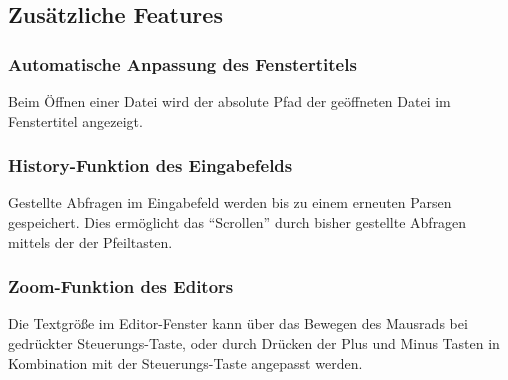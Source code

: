 \documentclass[parskip=full,11pt,twoside]{scrartcl}
\begin{document}
\subsection{Zusätzliche Features}
	\subsubsection{Automatische Anpassung des Fenstertitels}
		Beim Öffnen einer Datei wird der absolute Pfad der geöffneten Datei im Fenstertitel angezeigt.
	
	\subsubsection{History-Funktion des Eingabefelds}
		Gestellte Abfragen im Eingabefeld werden bis zu einem erneuten Parsen gespeichert. Dies ermöglicht das \enquote{Scrollen} durch bisher gestellte Abfragen mittels der der Pfeiltasten.
		
	\subsubsection{Zoom-Funktion des Editors}
		Die Textgröße im Editor-Fenster kann über das Bewegen des Mausrads bei gedrückter Steuerungs-Taste, oder durch Drücken der Plus und Minus Tasten in Kombination mit der Steuerungs-Taste angepasst werden.
\end{document}

